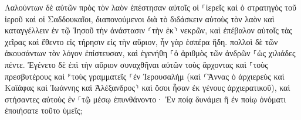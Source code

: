 \documentclass{openreader}
\begin{document}
Λαλούντων δὲ αὐτῶν πρὸς τὸν λαὸν ἐπέστησαν αὐτοῖς οἱ ⸀ἱερεῖς καὶ ὁ στρατηγὸς τοῦ ἱεροῦ καὶ οἱ Σαδδουκαῖοι, 
διαπονούμενοι διὰ τὸ διδάσκειν αὐτοὺς τὸν λαὸν καὶ καταγγέλλειν ἐν τῷ Ἰησοῦ τὴν ἀνάστασιν ⸂τὴν ἐκ⸃ νεκρῶν, 
καὶ ἐπέβαλον αὐτοῖς τὰς χεῖρας καὶ ἔθεντο εἰς τήρησιν εἰς τὴν αὔριον, ἦν γὰρ ἑσπέρα ἤδη. 
πολλοὶ δὲ τῶν ἀκουσάντων τὸν λόγον ἐπίστευσαν, καὶ ἐγενήθη ⸀ὁ ἀριθμὸς τῶν ἀνδρῶν ⸀ὡς χιλιάδες πέντε. 
Ἐγένετο δὲ ἐπὶ τὴν αὔριον συναχθῆναι αὐτῶν τοὺς ἄρχοντας καὶ ⸀τοὺς πρεσβυτέρους καὶ ⸁τοὺς γραμματεῖς ⸀ἐν Ἰερουσαλήμ 
(καὶ ⸂Ἅννας ὁ ἀρχιερεὺς καὶ Καϊάφας καὶ Ἰωάννης καὶ Ἀλέξανδρος⸃ καὶ ὅσοι ἦσαν ἐκ γένους ἀρχιερατικοῦ), 
καὶ στήσαντες αὐτοὺς ἐν ⸀τῷ μέσῳ ἐπυνθάνοντο· Ἐν ποίᾳ δυνάμει ἢ ἐν ποίῳ ὀνόματι ἐποιήσατε τοῦτο ὑμεῖς; 
\end{document}
